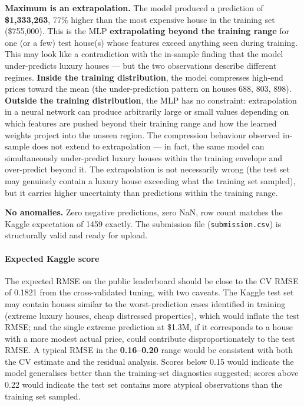 \textbf{Maximum is an extrapolation.} The model produced a prediction of
\textbf{\$1,333,263}, 77\% higher than the most expensive house in the
training set (\$755,000). This is the MLP \textbf{extrapolating beyond
the training range} for one (or a few) test house(s) whose features
exceed anything seen during training. This may look like a contradiction
with the in-sample finding that the model under-predicts luxury houses
--- but the two observations describe different regimes. \textbf{Inside
the training distribution}, the model compresses high-end prices toward
the mean (the under-prediction pattern on houses 688, 803, 898).
\textbf{Outside the training distribution}, the MLP has no constraint:
extrapolation in a neural network can produce arbitrarily large or small
values depending on which features are pushed beyond their training
range and how the learned weights project into the unseen region. The
compression behaviour observed in-sample does not extend to
extrapolation --- in fact, the same model can simultaneously
under-predict luxury houses within the training envelope and
over-predict beyond it. The extrapolation is not necessarily wrong (the
test set may genuinely contain a luxury house exceeding what the
training set sampled), but it carries higher uncertainty than
predictions within the training range.

\textbf{No anomalies.} Zero negative predictions, zero NaN, row count
matches the Kaggle expectation of 1459 exactly. The submission file
(\texttt{submission.csv}) is structurally valid and ready for upload.

\paragraph{Expected Kaggle score}\label{expected-kaggle-score}

The expected RMSE on the public leaderboard should be close to the CV
RMSE of 0.1821 from the cross-validated tuning, with two caveats. The
Kaggle test set may contain houses similar to the worst-prediction cases
identified in training (extreme luxury houses, cheap distressed
properties), which would inflate the test RMSE; and the single extreme
prediction at \$1.3M, if it corresponds to a house with a more modest
actual price, could contribute disproportionately to the test RMSE. A
typical RMSE in the \textbf{0.16--0.20} range would be consistent with
both the CV estimate and the residual analysis. Scores below 0.15 would
indicate the model generalises better than the training-set diagnostics
suggested; scores above 0.22 would indicate the test set contains more
atypical observations than the training set sampled.


